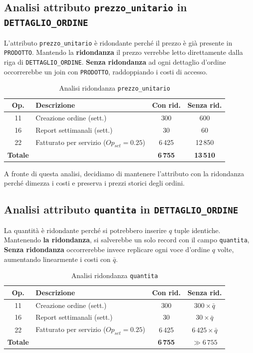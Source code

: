 \documentclass[a4paper,12pt]{report}
\begin{document}
\subsection{Analisi attributo \texttt{prezzo\_unitario} in \texttt{DETTAGLIO\_ORDINE}}
L’attributo \texttt{prezzo\_unitario} è ridondante perché il prezzo è già presente in \texttt{PRODOTTO}.
Mantendo la \textbf{ridondanza} il prezzo verrebbe letto direttamente dalla riga di \texttt{DETTAGLIO\_ORDINE}.
\textbf{Senza ridondanza} ad ogni dettaglio d’ordine occorrerebbe un join con \texttt{PRODOTTO}, raddoppiando i costi di accesso.

\begin{table}[H]
\centering
\small
\begin{tabular}{|c|l|c|c|}
\hline
\rowcolor{gray!20}
\textbf{Op.} & \textbf{Descrizione} & \textbf{Con rid.} & \textbf{Senza rid.} \\
\hline
11 & Creazione ordine (sett.) & 300 & 600 \\
16 & Report settimanali (sett.) & 30 & 60 \\
22 & Fatturato per servizio ($Op_{set}=0.25$) & 6\,425 & 12\,850 \\
\hline
\textbf{Totale} & & \textbf{6\,755} & \textbf{13\,510} \\
\hline
\end{tabular}
\caption{Analisi ridondanza \texttt{prezzo\_unitario}}
\end{table}

\noindent
A fronte di questa analisi, decidiamo di mantenere l’attributo con la ridondanza perché dimezza i costi e preserva i prezzi storici degli ordini.

\subsection{Analisi attributo \texttt{quantita} in \texttt{DETTAGLIO\_ORDINE}}
La quantità è ridondante perché si potrebbero inserire $q$ tuple identiche.  
Mantenendo \textbf{la ridondanza}, si salverebbe un solo record con il campo \texttt{quantita}, 
\textbf{Senza ridondanza} occorrerebbe invece replicare ogni voce d’ordine $q$ volte, aumentando linearmente i costi con $\bar{q}$.


\begin{table}[H]
\centering
\small
\begin{tabular}{|c|l|c|c|}
\hline
\rowcolor{gray!20}
\textbf{Op.} & \textbf{Descrizione} & \textbf{Con rid.} & \textbf{Senza rid.} \\
\hline
11 & Creazione ordine (sett.) & 300 & $300 \times \bar{q}$ \\
16 & Report settimanali (sett.) & 30 & $30 \times \bar{q}$ \\
22 & Fatturato per servizio ($Op_{set}=0.25$) & 6\,425 & $6\,425 \times \bar{q}$ \\
\hline
\textbf{Totale} & & \textbf{6\,755} & $\gg 6\,755$ \\
\hline
\end{tabular}
\caption{Analisi ridondanza \texttt{quantita}}
\end{table}
\end{document}
